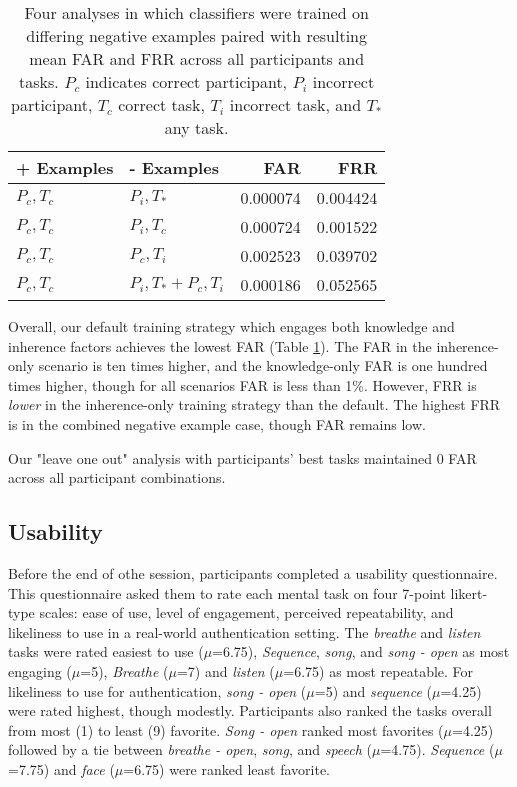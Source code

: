 \documentclass{sigchi}
\begin{document}
\begin{table}[h]
\begin{center}
\begin{tabular}{llrr}
 \textbf{+ Examples} & \textbf{- Examples} & \textbf{FAR} & \textbf{FRR} \\
\hline
$P_c, T_c$ & $P_i, T_*$ & 0.000074 & 0.004424\\
$P_c, T_c$ & $P_i, T_c$ & 0.000724 & 0.001522\\
$P_c, T_c$ & $P_c, T_i$ & 0.002523 & 0.039702\\
$P_c, T_c$ & $P_i, T_* + P_c, T_i$ & 0.000186 & 0.052565\\
\hline
\end{tabular}
\end{center}
\caption{Four analyses in which classifiers were trained on differing negative examples paired with resulting mean FAR and FRR across all participants and tasks. $P_c$ indicates correct participant, $P_i$ incorrect participant, $T_c$ correct task, $T_i$ incorrect task, and $T_*$ any task.}
\label{tab:compare}
\end{table}

Overall, our default training strategy which engages both knowledge and inherence factors achieves the lowest FAR (Table \ref{tab:compare}). The FAR in the inherence-only scenario is ten times higher, and the knowledge-only FAR is one hundred times higher, though for all scenarios FAR is less than 1\%. However, FRR is \textit{lower} in the inherence-only training strategy than the default. The highest FRR is in the combined negative example case, though FAR remains low.

Our "leave one out" analysis with participants' best tasks maintained 0 FAR across all participant combinations. 

\subsection{Usability}

Before the end of othe session, participants completed a usability questionnaire. This questionnaire asked them to rate each mental task on four 7-point likert-type scales: ease of use, level of engagement, perceived repeatability, and likeliness to use in a real-world authentication setting. The \textit{breathe} and \textit{listen} tasks were rated easiest to use (\(\mu\)=6.75), \textit{Sequence}, \textit{song}, and \textit{song - open} as most engaging (\(\mu\)=5), \textit{Breathe} (\(\mu\)=7) and \textit{listen} (\(\mu\)=6.75) as most repeatable. For likeliness to use for authentication, \textit{song - open} (\(\mu\)=5) and \textit{sequence} (\(\mu\)=4.25) were rated highest, though modestly. Participants also ranked the tasks overall from most (1) to least (9) favorite. \textit{Song - open} ranked most favorites (\(\mu\)=4.25) followed by a tie between \textit{breathe - open}, \textit{song}, and \textit{speech} (\(\mu\)=4.75). \textit{Sequence} (\(\mu\)=7.75) and \textit{face} (\(\mu\)=6.75) were ranked least favorite.
\end{document}
